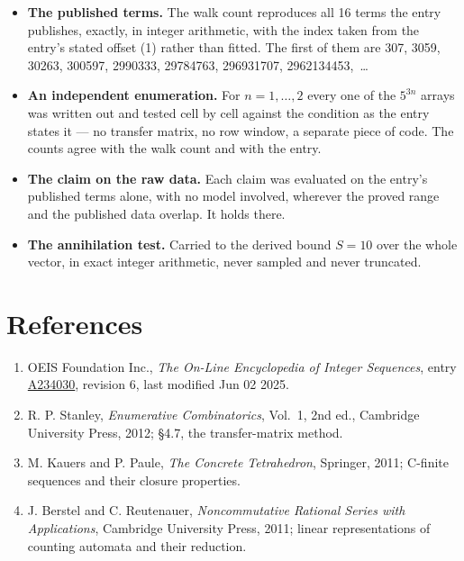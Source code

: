 \documentclass[11pt]{article}
\theoremstyle{definition}
\begin{document}
\begin{itemize}

\item {\bfseries The published terms.} The walk count reproduces all 16 terms the entry publishes, exactly, in integer arithmetic, with the index taken from the entry's stated offset (1) rather than fitted. The first of them are 307, 3059, 30263, 300597, 2990333, 29784763, 296931707, 2962134453,~\dots

\item {\bfseries An independent enumeration.} For $n = 1,\dots,2$ every one of the $5^{3n}$ arrays was written out and tested cell by cell against the condition as the entry states it --- no transfer matrix, no row window, a separate piece of code. The counts agree with the walk count and with the entry.

\item {\bfseries The claim on the raw data.} Each claim was evaluated on the entry's published terms alone, with no model involved, wherever the proved range and the published data overlap. It holds there.

\item {\bfseries The annihilation test.} Carried to the derived bound $S = 10$ over the whole vector, in exact integer arithmetic, never sampled and never truncated.

\end{itemize}

\section{References}

\begin{enumerate}

\item OEIS Foundation Inc., \emph{The On-Line Encyclopedia of Integer Sequences}, entry \href{https://oeis.org/A234030}{A234030}, revision 6, last modified Jun 02 2025.

\item R. P. Stanley, \emph{Enumerative Combinatorics}, Vol.~1, 2nd ed., Cambridge University Press, 2012; \S4.7, the transfer-matrix method.

\item M. Kauers and P. Paule, \emph{The Concrete Tetrahedron}, Springer, 2011; C-finite sequences and their closure properties.

\item J. Berstel and C. Reutenauer, \emph{Noncommutative Rational Series with Applications}, Cambridge University Press, 2011; linear representations of counting automata and their reduction.

\end{enumerate}
\end{document}
